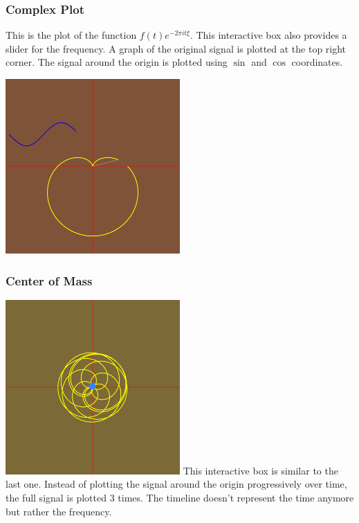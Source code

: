 \documentclass{article}
\begin{document}
\pagebreak

\subsubsection{Complex Plot}

\begin{multicols}{2}
    This is the plot of the function \(f(t)e^{-2\pi it\xi}\).
    This interactive box also provides a slider for the frequency.
    A graph of the original signal is plotted at the top right corner.
    The signal around the origin is plotted using \(\sin\) and \(\cos\) coordinates.

    \includegraphics[width=0.5\textwidth]{complexplot.png}
\end{multicols}

\subsubsection{Center of Mass}

\begin{multicols}{2}
    \includegraphics[width=0.5\textwidth]{centerofmass.png}
    This interactive box is similar to the last one.
    Instead of plotting the signal around the origin progressively over time,
    the full signal is plotted 3 times. The timeline doesn't represent
    the time anymore but rather the frequency.
\end{multicols}
\end{document}
